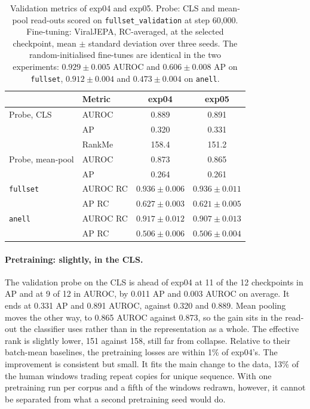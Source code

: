 \documentclass[10pt,twocolumn,a4paper]{article}
\begin{document}
\begin{table}[t]
\centering
\caption{Validation metrics of exp04 and exp05. Probe: CLS and mean-pool
read-outs scored on \texttt{fullset\_validation} at step 60{,}000. Fine-tuning:
ViralJEPA, RC-averaged, at the selected checkpoint, mean $\pm$ standard deviation
over three seeds. The random-initialised fine-tunes are identical in the two
experiments: $0.929\pm0.005$ AUROC and $0.606\pm0.008$ AP on \texttt{fullset},
$0.912\pm0.004$ and $0.473\pm0.004$ on \texttt{anell}.}
\label{tab:val45}
\footnotesize
\setlength{\tabcolsep}{4pt}
\begin{tabular}{llcc}
\toprule
 & Metric & exp04 & exp05 \\
\midrule
Probe, CLS       & AUROC  & 0.889 & 0.891 \\
                 & AP     & 0.320 & 0.331 \\
                 & RankMe & 158.4 & 151.2 \\
Probe, mean-pool & AUROC  & 0.873 & 0.865 \\
                 & AP     & 0.264 & 0.261 \\
\midrule
\texttt{fullset} & AUROC RC & $0.936\pm0.006$ & $0.936\pm0.011$ \\
                 & AP RC    & $0.627\pm0.003$ & $0.621\pm0.005$ \\
\texttt{anell}   & AUROC RC & $0.917\pm0.012$ & $0.907\pm0.013$ \\
                 & AP RC    & $0.506\pm0.006$ & $0.506\pm0.004$ \\
\bottomrule
\end{tabular}
\end{table}

\paragraph{Pretraining: slightly, in the CLS.} The validation probe on the CLS is
ahead of exp04 at 11 of the 12 checkpoints in AP and at 9 of 12 in AUROC, by 0.011
AP and 0.003 AUROC on average. It ends at 0.331 AP and 0.891 AUROC, against 0.320
and 0.889. Mean pooling moves the other way, to 0.865 AUROC against 0.873, so the
gain sits in the read-out the classifier uses rather than in the representation as
a whole. The effective rank is slightly lower, 151 against 158, still far from
collapse. Relative to their batch-mean baselines, the pretraining losses are
within 1\% of exp04's. The improvement is consistent but small. It fits the main
change to the data, 13\% of the human windows trading repeat copies for unique
sequence. With one pretraining run per corpus and a fifth of the windows redrawn,
however, it cannot be separated from what a second pretraining seed would do.
\end{document}
